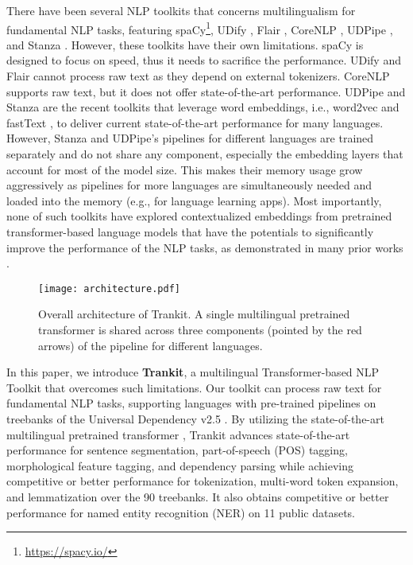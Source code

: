 \documentclass[11pt,a4paper]{article}
\begin{document}
There have been several NLP toolkits that concerns multilingualism for fundamental NLP tasks, featuring spaCy\footnote{\url{https://spacy.io/}}, UDify \citep{kondratyuk-straka-2019-75}, Flair \citep{akbik-etal-2019-flair}, CoreNLP \citep{manning-etal-2014-stanford}, UDPipe \citep{straka-2018-udpipe}, and Stanza \citep{qi-etal-2020-stanza}. However, these toolkits have their own limitations. spaCy is designed to focus on speed, thus it needs to sacrifice the performance. UDify and Flair cannot process raw text as they depend on external tokenizers. CoreNLP supports raw text, but it does not offer state-of-the-art performance. UDPipe and Stanza are the recent toolkits that leverage word embeddings, i.e., word2vec \citep{mikolov2013distributed} and fastText \citep{bojanowski-etal-2017-enriching}, to deliver current state-of-the-art performance for many languages. However, Stanza and UDPipe's pipelines for different languages are trained separately and do not share any component, especially the embedding layers that account for most of the model size. This makes their memory usage grow aggressively as pipelines for more languages are simultaneously needed and loaded into the memory (e.g., for language learning apps). Most importantly, none of such toolkits have explored contextualized embeddings from pretrained transformer-based language models that have the potentials to significantly improve the performance of the NLP tasks, as demonstrated in many prior works \citep{devlin-etal-2019-bert,liu2019roberta,conneau-etal-2020-unsupervised}.

\begin{figure*}
    \centering
\texttt{[image: architecture.pdf]}
    \caption{Overall architecture of Trankit. A single multilingual pretrained transformer is shared across three components (pointed by the red arrows) of the pipeline for different languages.}
    \label{fig:architecture}
\end{figure*}

In this paper, we introduce \textbf{Trankit}, a multilingual Transformer-based NLP Toolkit that overcomes such limitations. Our toolkit can process raw text for fundamental NLP tasks, supporting  languages with  pre-trained pipelines on  treebanks of the Universal Dependency v2.5 \citep{11234/1-3105}. By utilizing the state-of-the-art multilingual pretrained transformer  \citep{conneau-etal-2020-unsupervised}, Trankit advances state-of-the-art performance for sentence segmentation, part-of-speech (POS) tagging, morphological feature tagging, and dependency parsing while achieving competitive or better performance for tokenization, multi-word token expansion, and lemmatization over the 90 treebanks. It also obtains competitive or better performance for named entity recognition (NER) on 11 public datasets.
\end{document}
